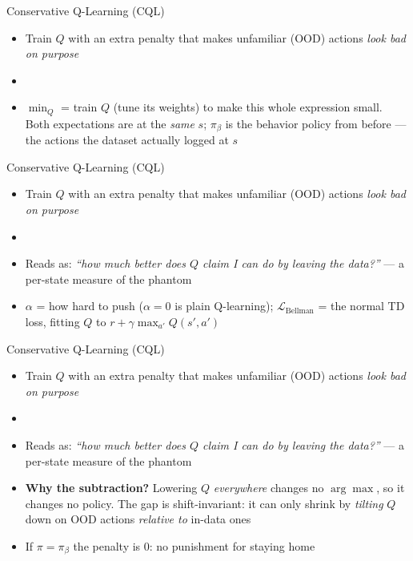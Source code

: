 \begin{frame}{Conservative Q-Learning (CQL)}
\begin{itemize}
    \item Train $Q$ with an extra penalty that makes unfamiliar (OOD) actions
          \emph{look bad on purpose}
    \item[] \cqlobjective
    \item $\min_Q$ = train $Q$ (tune its weights) to make this whole expression
          small. Both expectations are at the \emph{same} $s$; $\pi_\beta$ is the
          behavior policy from before --- the actions the dataset actually
          logged at $s$
\end{itemize}
\end{frame}

\begin{frame}{Conservative Q-Learning (CQL)}
\begin{itemize}
    \item Train $Q$ with an extra penalty that makes unfamiliar (OOD) actions
          \emph{look bad on purpose}
    \item[] \cqlobjective
    \item Reads as: \emph{``how much better does $Q$ claim I can do by leaving
          the data?''} --- a per-state measure of the phantom
    \item $\alpha$ = how hard to push ($\alpha{=}0$ is plain Q-learning);
          $\mathcal{L}_{\mathrm{Bellman}}$ = the normal TD loss, fitting $Q$ to
          $r + \gamma \max_{a'} Q(s',a')$
\end{itemize}
\end{frame}

\begin{frame}{Conservative Q-Learning (CQL)}
\begin{itemize}
    \item Train $Q$ with an extra penalty that makes unfamiliar (OOD) actions
          \emph{look bad on purpose}
    \item[] \cqlobjective
    \item Reads as: \emph{``how much better does $Q$ claim I can do by leaving
          the data?''} --- a per-state measure of the phantom
    \item \textbf{Why the subtraction?} Lowering $Q$ \emph{everywhere} changes no
          $\arg\max$, so it changes no policy. The gap is shift-invariant: it can
          only shrink by \emph{tilting} $Q$ down on OOD actions \emph{relative to}
          in-data ones
    \item If $\pi = \pi_\beta$ the penalty is $0$: no punishment for staying home
\end{itemize}
\end{frame}


